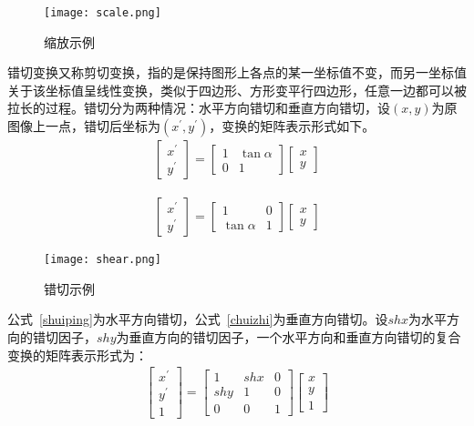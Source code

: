    \begin{figure}[ht!]
   \centering
  \texttt{[image: scale.png]}
  \caption{缩放示例}
 \end{figure}
 
 错切变换又称剪切变换，指的是保持图形上各点的某一坐标值不变，而另一坐标值关于该坐标值呈线性变换，类似于四边形、方形变平行四边形，任意一边都可以被拉长的过程。错切分为两种情况：水平方向错切和垂直方向错切，设$(x,y)$为原图像上一点，错切后坐标为$(x^{'},y^{'})$，变换的矩阵表示形式如下。
 \begin{align}
\left[ \begin{array}{c}
x^{'} \\
y^{'}
\end{array} \right]
=
\left[ \begin{array}{ccc}
1 & \tan \alpha \\
0 & 1
\end{array} \right]
\left[ \begin{array}{c}
x \\
y
\end{array} \right]
\label{shuiping}
\end{align}

  \begin{align}
\left[ \begin{array}{c}
x^{'} \\
y^{'}
\end{array} \right]
=
\left[ \begin{array}{ccc}
1 & 0 \\
\tan \alpha & 1
\end{array} \right]
\left[ \begin{array}{c}
x \\
y
\end{array} \right]
\label{chuizhi}
\end{align}
    \begin{figure}[ht!]
   \centering
  \texttt{[image: shear.png]}
  \caption{错切示例}
 \end{figure}

公式~\ref{shuiping}为水平方向错切，公式~\ref{chuizhi}为垂直方向错切。设$shx$为水平方向的错切因子，$shy$为垂直方向的错切因子，一个水平方向和垂直方向错切的复合变换的矩阵表示形式为：
 \begin{align}
\left[ \begin{array}{c}
x^{'} \\
y^{'}\\
1   
\end{array} \right]
=
\left[ \begin{array}{ccc}
1 & shx & 0 \\
shy & 1& 0 \\
0 & 0 & 1
\end{array} \right]
\left[ \begin{array}{c}
x \\
y\\
1
\end{array} \right]
\end{align}
	 	

